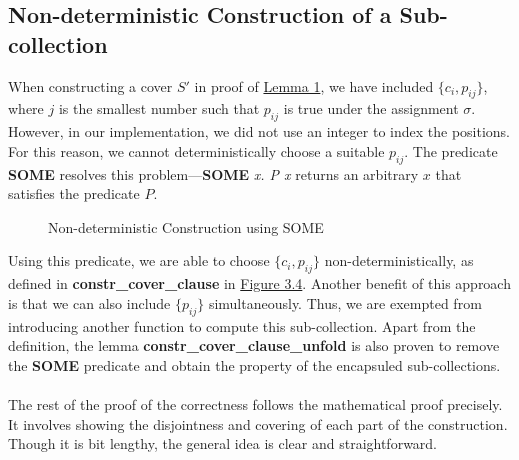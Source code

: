 \subsection*{Non-deterministic Construction of a Sub-collection}
When constructing a cover $S'$ in proof of \hyperref[lemma:xcsound]{Lemma 1}, we have included $\{c_i, p_{ij}\}$, where $j$ is the smallest number 
such that $p_{ij}$ is true under the assignment $\sigma$. However, in our implementation, 
we did not use an integer to index the positions. For this reason, we cannot deterministically choose 
a suitable $p_{ij}$. The predicate \textbf{SOME} resolves this problem---\textbf{SOME} \textit{x. P x}
returns an arbitrary $x$ that satisfies the predicate $P$.
\begin{figure}[h!]
\caption{Non-deterministic Construction using SOME}
\label{figure:7}
\end{figure} 
Using this predicate, we are able to choose $\{c_i, p_{ij}\}$ non-deterministically, as defined in \textbf{constr\_cover\_clause} in \hyperref[fig:7]{Figure 3.4}. 
Another benefit of this approach is that we can also include $\{p_{ij}\}$ simultaneously. Thus, we are exempted from introducing another function 
to compute this sub-collection. Apart from the definition, the lemma \textbf{constr\_cover\_clause\_unfold} is also proven to remove the \textbf{SOME}
predicate and obtain the property of the encapsuled sub-collections. \\\\
The rest of the proof of the correctness follows the mathematical proof precisely. 
It involves showing the disjointness and covering of each part of the construction. 
Though it is bit lengthy, the general idea is clear and straightforward.

